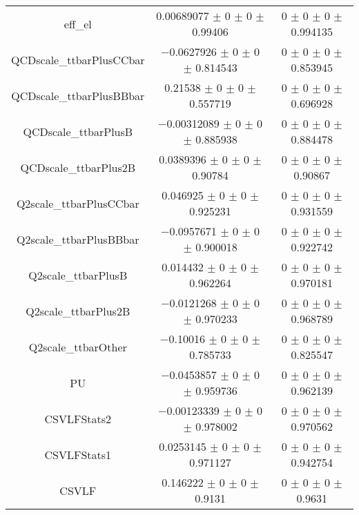 \begin{table}
\begin{tabular}{ccc}
eff\_el 	& \num{0.00689077} $\pm$ \num{0} $\pm$ \num{0} $\pm$ \num{0.99406} 	& \num{0} $\pm$ \num{0} $\pm$ \num{0} $\pm$ \num{0.994135}\\
QCDscale\_ttbarPlusCCbar 	& \num{-0.0627926} $\pm$ \num{0} $\pm$ \num{0} $\pm$ \num{0.814543} 	& \num{0} $\pm$ \num{0} $\pm$ \num{0} $\pm$ \num{0.853945}\\
QCDscale\_ttbarPlusBBbar 	& \num{0.21538} $\pm$ \num{0} $\pm$ \num{0} $\pm$ \num{0.557719} 	& \num{0} $\pm$ \num{0} $\pm$ \num{0} $\pm$ \num{0.696928}\\
QCDscale\_ttbarPlusB 	& \num{-0.00312089} $\pm$ \num{0} $\pm$ \num{0} $\pm$ \num{0.885938} 	& \num{0} $\pm$ \num{0} $\pm$ \num{0} $\pm$ \num{0.884478}\\
QCDscale\_ttbarPlus2B 	& \num{0.0389396} $\pm$ \num{0} $\pm$ \num{0} $\pm$ \num{0.90784} 	& \num{0} $\pm$ \num{0} $\pm$ \num{0} $\pm$ \num{0.90867}\\
Q2scale\_ttbarPlusCCbar 	& \num{0.046925} $\pm$ \num{0} $\pm$ \num{0} $\pm$ \num{0.925231} 	& \num{0} $\pm$ \num{0} $\pm$ \num{0} $\pm$ \num{0.931559}\\
Q2scale\_ttbarPlusBBbar 	& \num{-0.0957671} $\pm$ \num{0} $\pm$ \num{0} $\pm$ \num{0.900018} 	& \num{0} $\pm$ \num{0} $\pm$ \num{0} $\pm$ \num{0.922742}\\
Q2scale\_ttbarPlusB 	& \num{0.014432} $\pm$ \num{0} $\pm$ \num{0} $\pm$ \num{0.962264} 	& \num{0} $\pm$ \num{0} $\pm$ \num{0} $\pm$ \num{0.970181}\\
Q2scale\_ttbarPlus2B 	& \num{-0.0121268} $\pm$ \num{0} $\pm$ \num{0} $\pm$ \num{0.970233} 	& \num{0} $\pm$ \num{0} $\pm$ \num{0} $\pm$ \num{0.968789}\\
Q2scale\_ttbarOther 	& \num{-0.10016} $\pm$ \num{0} $\pm$ \num{0} $\pm$ \num{0.785733} 	& \num{0} $\pm$ \num{0} $\pm$ \num{0} $\pm$ \num{0.825547}\\
PU 	& \num{-0.0453857} $\pm$ \num{0} $\pm$ \num{0} $\pm$ \num{0.959736} 	& \num{0} $\pm$ \num{0} $\pm$ \num{0} $\pm$ \num{0.962139}\\
CSVLFStats2 	& \num{-0.00123339} $\pm$ \num{0} $\pm$ \num{0} $\pm$ \num{0.978002} 	& \num{0} $\pm$ \num{0} $\pm$ \num{0} $\pm$ \num{0.970562}\\
CSVLFStats1 	& \num{0.0253145} $\pm$ \num{0} $\pm$ \num{0} $\pm$ \num{0.971127} 	& \num{0} $\pm$ \num{0} $\pm$ \num{0} $\pm$ \num{0.942754}\\
CSVLF 	& \num{0.146222} $\pm$ \num{0} $\pm$ \num{0} $\pm$ \num{0.9131} 	& \num{0} $\pm$ \num{0} $\pm$ \num{0} $\pm$ \num{0.9631}\\

\end{tabular}
\end{table}
